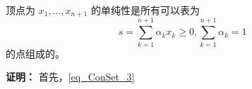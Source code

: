 \begin{theorem}{}
顶点为  $x_1,\ldots,x_{n+1}$ 的单纯性是所有可以表为
\begin{equation}\label{eq_ConSet_3}
s=\sum_{k=1}^{n+1} \alpha_k x_k\geq0,\sum_{k=1}^{n+1}\alpha_k=1~
\end{equation}
的点组成的。
\end{theorem}

\textbf{证明：}
首先，\autoref{eq_ConSet_3}




















